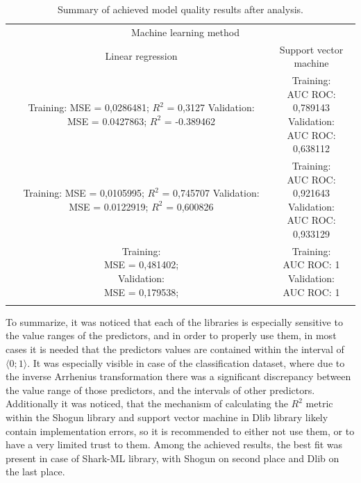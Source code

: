 \begin{longtable}{c | c | c }
	\centering
	\multirow{2}{*}{\makecell{Library}} & \multicolumn{2}{c}{Machine learning method} \\
	\cline{2-3}
	& Linear regression & Support vector machine \\
	\hline
	\makecell{Shogun} & \makecell{Training: \\ MSE = 0,0286481; $R^2$ = 0,3127 \\ Validation: \\ MSE = 0.0427863; $R^2$ = -0.389462} & \makecell{Training: \\ AUC ROC: 0,789143 \\ Validation: \\ AUC ROC: 0,638112} \\
	\hline
	\makecell{Shark} & \makecell{Training: \\ MSE = 0,0105995; $R^2$ = 0,745707 \\ Validation: \\ MSE = 0.0122919; $R^2$ = 0,600826} & \makecell{Training: \\ AUC ROC: 0,921643 \\ Validation: \\ AUC ROC: 0,933129} \\
	\hline
	\makecell{Dlib} & \makecell{Training: \\ MSE = 0,481402; \\ Validation: \\ MSE = 0,179538; } & \makecell{Training: \\ AUC ROC: 1 \\ Validation: \\ AUC ROC: 1} \\
	\caption{Summary of achieved model quality results after analysis.}
	\label{tab:models2}
\end{longtable} 

To summarize, it was noticed that each of the libraries is especially sensitive to the value ranges of the predictors, and in order to properly use them, in most cases it is needed that the predictors values are contained within the interval of $\langle0; 1\rangle$. It was especially visible in case of the classification dataset, where due to the inverse Arrhenius transformation there was a significant discrepancy between the value range of those predictors, and the intervals of other predictors. Additionally it was noticed, that the mechanism of calculating the $R^2$ metric within the Shogun library and support vector machine in Dlib library likely contain implementation errors, so it is recommended to either not use them, or to have a very limited trust to them. Among the achieved results, the best fit was present in case of Shark-ML library, with Shogun on second place and Dlib on the last place.

